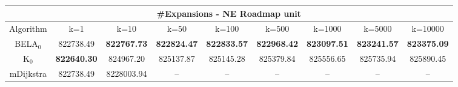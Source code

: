 \begin{tabular}{c|cccccccc}\toprule
\multicolumn{9}{c}{#Expansions - NE Roadmap unit}\\ \midrule
Algorithm & k=1 & k=10 & k=50 & k=100 & k=500 & k=1000 & k=5000 & k=10000 \\ \midrule
BELA$_0$ & 822738.49 & \textbf{822767.73} & \textbf{822824.47} & \textbf{822833.57} & \textbf{822968.42} & \textbf{823097.51} & \textbf{823241.57} & \textbf{823375.09} \\
K$_0$ & \textbf{822640.30} & 824967.20 & 825137.87 & 825145.28 & 825379.84 & 825556.65 & 825735.94 & 825890.45 \\
mDijkstra & 822738.49 & 8228003.94 & -- & -- & -- & -- & -- & -- \\ \bottomrule 
\end{tabular}
